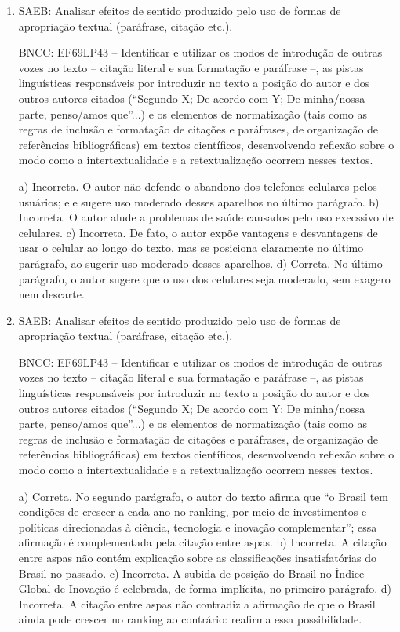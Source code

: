 
\begin{enumerate}

\item
SAEB: Analisar efeitos de sentido produzido pelo uso de formas de
apropriação textual (paráfrase, citação etc.).

BNCC: EF69LP43 -- Identificar e utilizar os modos de introdução de
outras vozes no texto -- citação literal e sua formatação e paráfrase
--, as pistas linguísticas responsáveis por introduzir no texto a
posição do autor e dos outros autores citados (``Segundo X; De acordo
com Y; De minha/nossa parte, penso/amos que''...) e os elementos de
normatização (tais como as regras de inclusão e formatação de citações e
paráfrases, de organização de referências bibliográficas) em textos
científicos, desenvolvendo reflexão sobre o modo como a
intertextualidade e a retextualização ocorrem nesses textos.

a) Incorreta. O autor não defende o abandono dos telefones celulares pelos usuários; 
ele sugere uso moderado desses aparelhos no último parágrafo.
b) Incorreta. O autor alude a problemas de saúde causados pelo uso execssivo de celulares.
c) Incorreta. De fato, o autor expõe vantagens e desvantagens de usar o celular ao longo
do texto, mas se posiciona claramente no último parágrafo, ao sugerir uso moderado desses aparelhos.
d) Correta. No último parágrafo, o autor sugere que o uso dos celulares seja moderado, sem exagero 
nem descarte.

\item
SAEB: Analisar efeitos de sentido produzido pelo uso de formas de
apropriação textual (paráfrase, citação etc.).

BNCC: EF69LP43 -- Identificar e utilizar os modos de introdução de
outras vozes no texto -- citação literal e sua formatação e paráfrase
--, as pistas linguísticas responsáveis por introduzir no texto a
posição do autor e dos outros autores citados (``Segundo X; De acordo
com Y; De minha/nossa parte, penso/amos que''...) e os elementos de
normatização (tais como as regras de inclusão e formatação de citações e
paráfrases, de organização de referências bibliográficas) em textos
científicos, desenvolvendo reflexão sobre o modo como a
intertextualidade e a retextualização ocorrem nesses textos.

a) Correta. No segundo parágrafo, o autor do texto afirma que ``o Brasil tem
   condições de crescer a cada ano no ranking, por meio de investimentos e
   políticas direcionadas à ciência, tecnologia e inovação complementar'';
   essa afirmação é complementada pela citação entre aspas.
b) Incorreta. A citação entre aspas não contém explicação sobre as
   classificações insatisfatórias do Brasil no passado.
c) Incorreta. A subida de posição do Brasil no Índice Global de Inovação é
   celebrada, de forma implícita, no primeiro parágrafo.
d) Incorreta. A citação entre aspas não contradiz a afirmação de que o Brasil
   ainda pode crescer no ranking ao contrário: reafirma essa possibilidade.


\end{enumerate}
